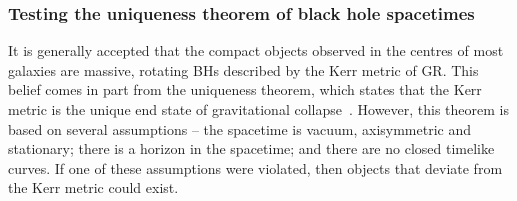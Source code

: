 \subsubsection{Testing the uniqueness theorem of black hole spacetimes}
\label{subsubsec:uniquenesstheorem}
It is generally accepted that the compact objects observed in 
the centres of most galaxies are massive, rotating BHs described by 
the Kerr metric of GR. This belief comes in part from the uniqueness 
theorem, which states that the Kerr metric is the unique end state 
of gravitational collapse~\cite{carter71}. However, this theorem is 
based on several assumptions -- the spacetime is vacuum, axisymmetric 
and stationary; there is a horizon in the spacetime; and there are no 
closed timelike curves. If one of these assumptions were violated, 
then objects that deviate from the Kerr metric could exist.
